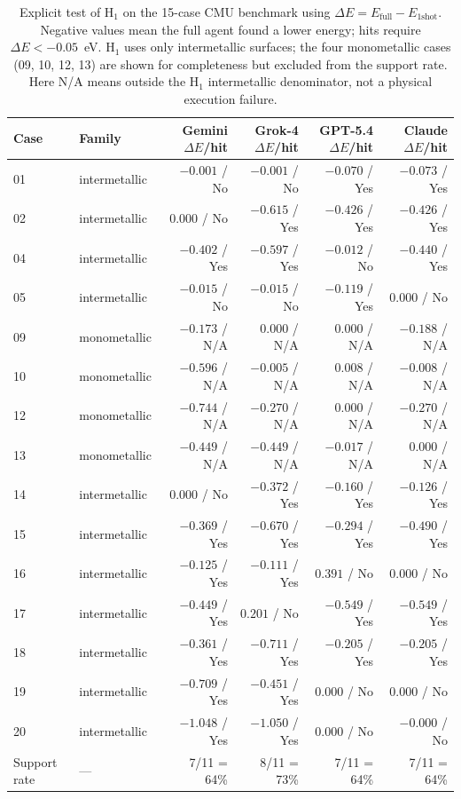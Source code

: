 \begin{table}[t]
\centering
\small
\caption{Explicit test of H$_1$ on the 15-case CMU benchmark using $\Delta E = E_{\mathrm{full}} - E_{\mathrm{1shot}}$. Negative values mean the full agent found a lower energy; hits require $\Delta E < -0.05$~eV. H$_1$ uses only intermetallic surfaces; the four monometallic cases (09, 10, 12, 13) are shown for completeness but excluded from the support rate. Here N/A means outside the H$_1$ intermetallic denominator, not a physical execution failure.}
\label{tab:hypothesis-test}
\begin{tabular}{llrrrr}
\toprule
Case & Family & Gemini $\Delta E$/hit & Grok-4 $\Delta E$/hit & GPT-5.4 $\Delta E$/hit & Claude $\Delta E$/hit \\
\midrule
01 & intermetallic & $-0.001$ / No & $-0.001$ / No & $-0.070$ / Yes & $-0.073$ / Yes \\
02 & intermetallic & $0.000$ / No & $-0.615$ / Yes & $-0.426$ / Yes & $-0.426$ / Yes \\
04 & intermetallic & $-0.402$ / Yes & $-0.597$ / Yes & $-0.012$ / No & $-0.440$ / Yes \\
05 & intermetallic & $-0.015$ / No & $-0.015$ / No & $-0.119$ / Yes & $0.000$ / No \\
09 & monometallic & $-0.173$ / N/A & $0.000$ / N/A & $0.000$ / N/A & $-0.188$ / N/A \\
10 & monometallic & $-0.596$ / N/A & $-0.005$ / N/A & $0.008$ / N/A & $-0.008$ / N/A \\
12 & monometallic & $-0.744$ / N/A & $-0.270$ / N/A & $0.000$ / N/A & $-0.270$ / N/A \\
13 & monometallic & $-0.449$ / N/A & $-0.449$ / N/A & $-0.017$ / N/A & $0.000$ / N/A \\
14 & intermetallic & $0.000$ / No & $-0.372$ / Yes & $-0.160$ / Yes & $-0.126$ / Yes \\
15 & intermetallic & $-0.369$ / Yes & $-0.670$ / Yes & $-0.294$ / Yes & $-0.490$ / Yes \\
16 & intermetallic & $-0.125$ / Yes & $-0.111$ / Yes & $0.391$ / No & $0.000$ / No \\
17 & intermetallic & $-0.449$ / Yes & $0.201$ / No & $-0.549$ / Yes & $-0.549$ / Yes \\
18 & intermetallic & $-0.361$ / Yes & $-0.711$ / Yes & $-0.205$ / Yes & $-0.205$ / Yes \\
19 & intermetallic & $-0.709$ / Yes & $-0.451$ / Yes & $0.000$ / No & $0.000$ / No \\
20 & intermetallic & $-1.048$ / Yes & $-1.050$ / Yes & $0.000$ / No & $-0.000$ / No \\
\midrule
Support rate & --- & 7/11 = 64\% & 8/11 = 73\% & 7/11 = 64\% & 7/11 = 64\% \\
\bottomrule
\end{tabular}
\end{table}

